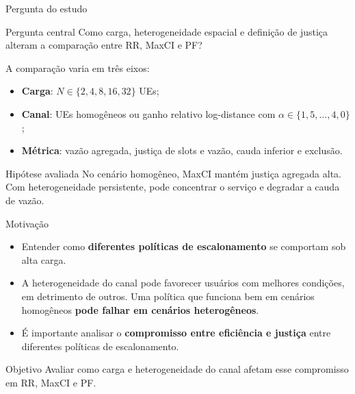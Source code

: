 \documentclass[noamsthm,notheorems,11pt,compress,fontset=windows]{beamer}
\numberwithin{figure}{section}
\numberwithin{table}{section}
\numberwithin{equation}{section}
\theoremstyle{plain} %
\begin{document}
\begin{frame}{Pergunta do estudo}
\begin{block}{Pergunta central}
Como carga, heterogeneidade espacial e definição de justiça alteram a comparação entre RR, MaxCI e PF?
\end{block}

\vspace{3mm}
A comparação varia em três eixos:
\begin{itemize}
    \item \textbf{Carga}: $N\in\{2,4,8,16,32\}$ UEs;
    \item \textbf{Canal}: UEs homogêneos ou ganho relativo log-distance com $\alpha\in\{1{,}5,\ldots,4{,}0\}$;
    \item \textbf{Métrica}: vazão agregada, justiça de slots e vazão, cauda inferior e exclusão.
\end{itemize}

\vspace{2mm}
\begin{alertblock}{Hipótese avaliada}
No cenário homogêneo, MaxCI mantém justiça agregada alta. Com heterogeneidade persistente, pode concentrar o serviço e degradar a cauda de vazão.
\end{alertblock}
\end{frame}






\begin{frame}{Motivação}
    \begin{itemize}
        \item Entender como \textbf{diferentes políticas de escalonamento} se comportam sob alta carga.

        \item A heterogeneidade do canal pode favorecer usuários com melhores condições, em detrimento de outros. Uma política que funciona bem em cenários homogêneos \textbf{pode falhar em cenários heterogêneos}.

        \item É importante analisar o \textbf{compromisso entre eficiência e justiça} entre diferentes políticas de escalonamento.

    \end{itemize}

    \begin{block}{Objetivo} Avaliar como carga e heterogeneidade do canal afetam esse compromisso em RR, MaxCI e PF.
    \end{block}
\end{frame}
\end{document}
